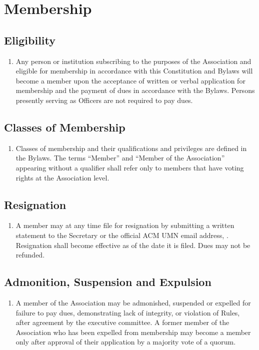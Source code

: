 \section{Membership}

\subsection{Eligibility}
\begin{enumerate}
	\item Any person or institution subscribing to the purposes of the Association and eligible for membership in accordance with this Constitution and Bylaws will become a member upon the acceptance of written or verbal application for membership and the payment of dues in accordance with the Bylaws. Persons presently serving as Officers are not required to pay dues.
\end{enumerate}

\subsection{Classes of Membership}
\begin{enumerate}
	\item Classes of membership and their qualifications and privileges are defined in the Bylaws. The terms ``Member'' and ``Member of the Association'' appearing without a qualifier shall refer only to members  that have voting rights at the Association level.
\end{enumerate}

\subsection{Resignation}
\begin{enumerate}
	\item A member may at any time file for resignation by submitting a written statement to the Secretary or the official ACM UMN email address, \email. Resignation shall become effective as of the date it is filed. Dues may not be refunded.
\end{enumerate}

\subsection{Admonition, Suspension and Expulsion}
\begin{enumerate}
	\item A member of the Association may be admonished, suspended or expelled for failure to pay dues, demonstrating lack of integrity, or violation of Rules, after agreement by the executive committee. A former member of the Association who has been expelled from membership may become a member only after approval of their application by a majority vote of a quorum.
\end{enumerate}

